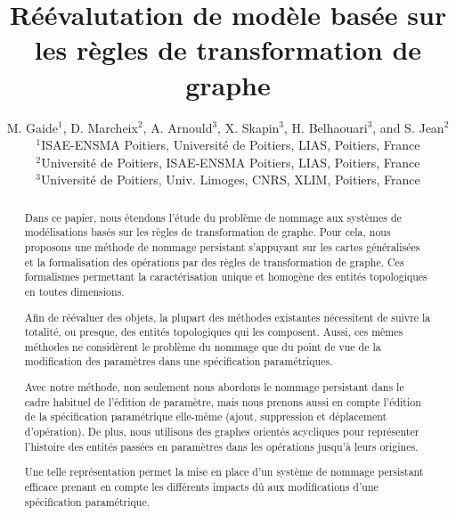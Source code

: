 \documentclass{rgtmg} %
\title{Réévalutation de modèle basée sur les règles de transformation de graphe}
\author[M. Gaide et al.]{%
	\parbox{\textwidth}{\centering M. Gaide$^{1}$, D. Marcheix$^{2}$, A.
		Arnould$^{3}$, X. Skapin$^{3}$, H. Belhaouari$^{3}$, and S. Jean$^{2}$
		\\
		\vspace{1em}
		$^1$ISAE-ENSMA Poitiers, Université de Poitiers, LIAS, Poitiers, France\\
		$^2$Université de Poitiers, ISAE-ENSMA Poitiers, LIAS, Poitiers, France\\
		$^3$Université de Poitiers, Univ. Limoges, CNRS, XLIM, Poitiers, France}}
\begin{document}
\maketitle

\begin{abstract}
  Dans ce papier, nous étendons l'étude du problème de nommage aux systèmes de
  modélisations basés sur les règles de transformation de graphe. %
  Pour cela, nous proposons une méthode de nommage persistant s'appuyant sur les
  cartes généralisées et la formalisation des opérations par des règles de
  transformation de graphe. %
  Ces formalismes permettant la caractérisation unique et homogène des entités
  topologiques en toutes dimensions. %

  Afin de réévaluer des objets, la plupart des méthodes existantes nécessitent
  de suivre la totalité, ou presque, des entités topologiques qui les
  composent. %
  Aussi, ces mêmes méthodes ne considèrent le problème du nommage que du point
  de vue de la modification des paramètres dans une spécification
  paramétriques. %

  Avec notre méthode, non seulement nous abordons le nommage persistant dans le
  cadre habituel de l'édition de paramètre, mais nous prenons aussi en compte
  l'édition de la spécification paramétrique elle-même (ajout, suppression et
  déplacement d'opération). %
  De plus, nous utilisons des graphes orientés acycliques pour représenter
  l'histoire des entités passées en paramètres dans les opérations jusqu'à leurs
  origines. %

  Une telle représentation permet la mise en place d'un système de nommage
  persistant efficace prenant en compte les différents impacts dû aux
  modifications d'une spécification paramétrique. %
\end{abstract}

\end{document}
